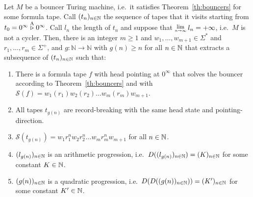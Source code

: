 \begin{theorem}\label{th:linquad}
    Let $M$ be a bouncer Turing machine, i.e.\ it satisfies Theorem~\ref{th:bouncers} for some formula tape. Call $(t_n)_{n\in\mathbb{N}}$ the sequence of tapes that it visits starting from $t_0 = 0^\infty \stackrel{\text{A}}\triangleright 0^\infty$. Call $l_n$ the length of $t_n$ and suppose that $\Lim{n\to\infty} l_n = +\infty$, i.e.\ $M$ is not a cycler. Then, there is an integer $m \geq 1$ and $w_1, \dots, w_{m+1} \in \Sigma^*$ and $r_1, \dots, r_{m} \in \Sigma^+$, and $g: \mathbb{N} \to \mathbb{N}$ with $g(n) \geq n$ for all $n\in\mathbb{N}$ that extracts a subsequence of $(t_n)_{n\in\mathbb{N}}$ such that:

    \begin{enumerate}
        \item There is a formula tape $f$ with head pointing at $0^\infty$ that solves the bouncer according to Theorem~\ref{th:bouncers} and with $\mathcal{S}(f) = w_1 (r_1) w_2 (r_2) \dots w_m (r_m) w_{m+1} $.
        \item All tapes $t_{g(n)}$ are record-breaking with the same head state and pointing-direction.
        \item $\mathcal{S}(t_{g(n)})=w_1 r_1^n w_2 r_2^n \dots w_m r_m^n w_{m+1}$ for all $n\in\mathbb{N}$.

        \item $(l_{g(n)})_{n\in\mathbb{N}}$ is an arithmetic progression, i.e.\ $D((l_{g(n)})_{n\in\mathbb{N}}) = (K)_{n\in\mathbb{N}}$ for some constant $K\in\mathbb{N}$.
        \item $(g(n))_{n\in\mathbb{N}}$ is a quadratic progression, i.e.\ $D(D((g(n))_{n\in\mathbb{N}})) = (K')_{n\in\mathbb{N}}$ for some constant $K'\in\mathbb{N}$.
    \end{enumerate}
\end{theorem}


